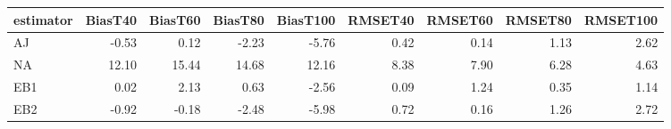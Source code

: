\begin{table}[ht]
\centering
\begin{tabular}{lrrrrrrrr}
  \toprule
estimator & BiasT40 & BiasT60 & BiasT80 & BiasT100 & RMSET40 & RMSET60 & RMSET80 & RMSET100 \\ 
  \midrule
AJ & -0.53 & 0.12 & -2.23 & -5.76 & 0.42 & 0.14 & 1.13 & 2.62 \\ 
  NA & 12.10 & 15.44 & 14.68 & 12.16 & 8.38 & 7.90 & 6.28 & 4.63 \\ 
  EB1 & 0.02 & 2.13 & 0.63 & -2.56 & 0.09 & 1.24 & 0.35 & 1.14 \\ 
  EB2 & -0.92 & -0.18 & -2.48 & -5.98 & 0.72 & 0.16 & 1.26 & 2.72 \\ 
   \bottomrule
\end{tabular}
\end{table}
